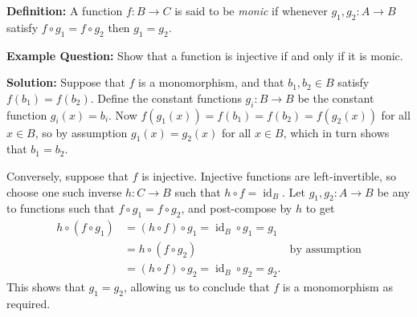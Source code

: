 \documentclass[aspectratio=169]{beamer}
\begin{document}
\begin{frame}[t]
    \textbf{Definition:} A function $f: B \to C$ is said to be \emph{monic} if whenever $g_1,g_2: A \to B$ satisfy $f \circ g_1 = f \circ g_2$ then $g_1=g_2$.

    \vfill

    \textbf{Example Question:} Show that a function is injective if and only if it is monic.

    \vfill

    \textbf{Solution:} Suppose that $f$ is a monomorphism, and that $b_1, b_2 \in B$ satisfy $f(b_1) = f(b_2)$. Define the constant functions $g_i: B \to B$ be the constant function $g_i(x) = b_i$. Now $f(g_1(x)) = f(b_1) = f(b_2) = f(g_2(x))$ for all $x \in B$, so by assumption $g_1(x) = g_2(x)$ for all $x \in B$, which in turn shows that $b_1 = b_2$.

        Conversely, suppose that $f$ is injective. Injective functions are left-invertible, so choose one such inverse $h : C \to B$ such that $h \circ f = \operatorname{id}_B$. Let $g_1,g_2: A \to B$ be any to functions such that $f\circ g_1 = f\circ g_2$, and post-compose by $h$ to get
        \begin{align*}
            h \circ (f \circ g_1) 
                &= (h \circ f) \circ g_1 = \operatorname{id}_B \circ g_1 = g_1 \\
                &= h \circ (f \circ g_2) & \text{by assumption} \\
                & = (h \circ f) \circ g_2 = \operatorname{id}_B \circ g_2 = g_2.
        \end{align*}
        This shows that $g_1 = g_2$, allowing us to conclude that $f$ is a monomorphism as required.

\end{frame}
\end{document}
